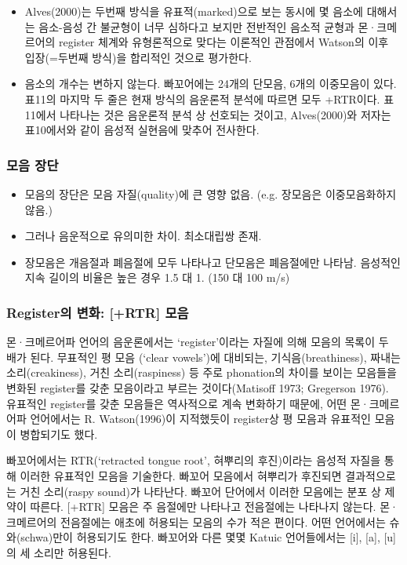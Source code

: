 \begin{itemize}
\item Alves(2000)는 두번째 방식을 유표적(marked)으로 보는 동시에 몇 음소에 대해서는 음소-음성 간 불균형이 너무 심하다고 보지만 전반적인 음소적 균형과 몬·크메르어의 register 체계와 유형론적으로 맞다는 이론적인 관점에서 Watson의 이후 입장(=두번째 방식)을 합리적인 것으로 평가한다.

\item 음소의 개수는 변하지 않는다. 빠꼬어에는 24개의 단모음, 6개의 이중모음이 있다. 표11의 마지막 두 줄은 현재 방식의 음운론적 분석에 따르면 모두 +RTR이다. 표11에서 나타나는 것은 음운론적 분석 상 선호되는 것이고, Alves(2000)와 저자는 표10에서와 같이 음성적 실현음에 맞추어 전사한다.
\end{itemize}

\subsubsection{모음 장단}
\begin{itemize}
\item 모음의 장단은 모음 자질(quality)에 큰 영향 없음. (e.g. 장모음은 이중모음화하지 않음.)

\item 그러나 음운적으로 유의미한 차이. 최소대립쌍 존재.

\item 장모음은 개음절과 폐음절에 모두 나타나고 단모음은 폐음절에만 나타남. 음성적인 지속 길이의 비율은 높은 경우 1.5 대 1. (150 대 100 m/s)
\end{itemize}

\subsubsection{Register의 변화:  [+RTR] 모음}
몬·크메르어파 언어의 음운론에서는 `register'이라는 자질에 의해 모음의 목록이 두 배가 된다. 무표적인 평 모음 (`clear vowels')에 대비되는, 기식음(breathiness), 짜내는 소리(creakiness), 거친 소리(raspiness) 등 주로 phonation의 차이를 보이는 모음들을 변화된 register를 갖춘 모음이라고 부르는 것이다(Matisoff 1973; Gregerson 1976). 유표적인 register를 갖춘 모음들은 역사적으로 계속 변화하기 때문에, 어떤 몬·크메르어파 언어에서는 R. Watson(1996)이 지적했듯이 register상 평 모음과 유표적인 모음이 병합되기도 했다.

빠꼬어에서는 RTR(`retracted tongue root', 혀뿌리의 후진)이라는 음성적 자질을 통해 이러한 유표적인 모음을 기술한다. 빠꼬어 모음에서 혀뿌리가 후진되면 결과적으로는 거친 소리(raspy sound)가 나타난다. 빠꼬어 단어에서 이러한 모음에는 분포 상 제약이 따른다. [+RTR] 모음은 주 음절에만 나타나고 전음절에는 나타나지 않는다. 몬·크메르어의 전음절에는 애초에 허용되는 모음의 수가 적은 편이다. 어떤 언어에서는 슈와(schwa)만이 허용되기도 한다. 빠꼬어와 다른 몇몇 Katuic 언어들에서는 [i], [a], [u]의 세 소리만 허용된다.

